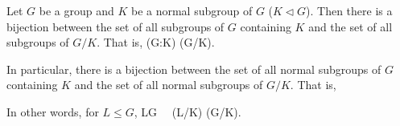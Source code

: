 


\begin{theorem}\label{thm:correspondence_subgroup_containg_normal_subgroup_quotient_group}%
Let $G$ be a group and $K$ be a normal subgroup of $G$ ($K\lhd G$). Then there is a bijection between the set of all subgroups of $G$ containing $K$ and the set of all subgroups of $G/K$. That is,
\be
\sub(G:K) \cong \sub(G/K).
\ee

In particular, there is a bijection between the set of all normal subgroups of $G$ containing $K$ and the set of all normal subgroups of $G/K$. That is,
\be
{}\ \longleftrightarrow \ 
\ee

In other words, for $L\leq G$,
\be
L\lhd G \ \lra \ (L/K) \lhd (G/K).
\ee
\end{theorem}

